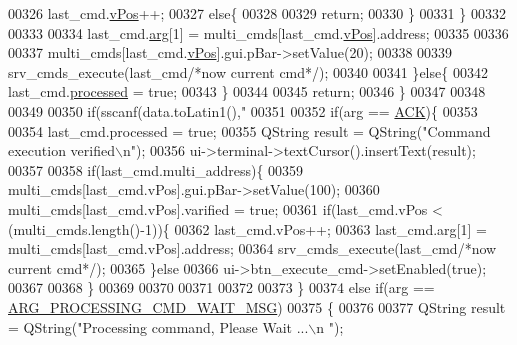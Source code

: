\begin{DoxyCode}
{{{{{{{{{{{{{{{00326                      last\_cmd.\hyperlink{a00001_a2b48b371fd84be2a8ad581b1ad708b88}{vPos}++;
00327                  \textcolor{keywordflow}{else}\{
00328 
00329                      \textcolor{keywordflow}{return};
00330                   \}
00331                  \}
00332 
00333 
00334                  last\_cmd.\hyperlink{a00001_a56e6c2d7315d0ae60a51e8b140c9cfe4}{arg}[1] = multi\_cmds[last\_cmd.\hyperlink{a00001_a2b48b371fd84be2a8ad581b1ad708b88}{vPos}].address;
00335 
00336 
00337                  multi\_cmds[last\_cmd.\hyperlink{a00001_a2b48b371fd84be2a8ad581b1ad708b88}{vPos}].gui.pBar->setValue(20);
00338 
00339                  srv\_cmds\_execute(last\_cmd\textcolor{comment}{/*now current cmd*/});
00340 
00341              \}\textcolor{keywordflow}{else}\{
00342                  last\_cmd.\hyperlink{a00001_a3e88f779da9798a5da7dda227e2ca388}{processed} = \textcolor{keyword}{true};
00343              \}
00344 
00345              \textcolor{keywordflow}{return};
00346      \}
00347 
00348 
00349 
00350     \textcolor{keywordflow}{if}(sscanf(data.toLatin1(),\textcolor{stringliteral}{"%
00351 
00352        \textcolor{keywordflow}{if}(arg == \hyperlink{a00034_a6f6489887e08bff4887d0bc5dcf214d8}{ACK})\{
00353 
00354                     last\_cmd.processed = \textcolor{keyword}{true};
00355                     QString result =  QString(\textcolor{stringliteral}{"Command execution verified\(\backslash\)n"});
00356                     ui->terminal->textCursor().insertText(result);
00357 
00358                     \textcolor{keywordflow}{if}(last\_cmd.multi\_address)\{
00359                          multi\_cmds[last\_cmd.vPos].gui.pBar->setValue(100);
00360                          multi\_cmds[last\_cmd.vPos].varified = \textcolor{keyword}{true};
00361                      \textcolor{keywordflow}{if}(last\_cmd.vPos < (multi\_cmds.length()-1))\{
00362                         last\_cmd.vPos++;
00363                         last\_cmd.arg[1] = multi\_cmds[last\_cmd.vPos].address;
00364                         srv\_cmds\_execute(last\_cmd\textcolor{comment}{/*now current cmd*/});
00365                     \}\textcolor{keywordflow}{else}
00366                         ui->btn\_execute\_cmd->setEnabled(\textcolor{keyword}{true});
00367 
00368                     \}
00369 
00370 
00371 
00372 
00373        \}
00374        \textcolor{keywordflow}{else} \textcolor{keywordflow}{if}(arg == \hyperlink{a00034_a89228259ebf351e938853637ef163a1b}{ARG\_PROCESSING\_CMD\_WAIT\_MSG})
00375        \{
00376 
00377                 QString result =  QString(\textcolor{stringliteral}{"Processing command, Please Wait ...\(\backslash\)n "});
}}}}}}}}}}}}}}}}
\end{DoxyCode}
